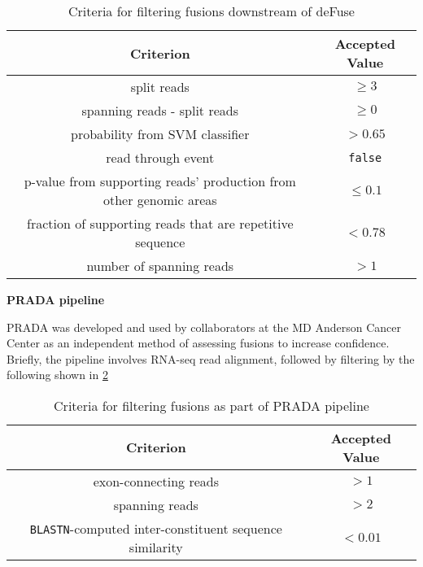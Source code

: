 \begin{description}
  \begin{table}
    \begin{center}
      \begin{tabular}{|c|c|} \hline \textbf{Criterion} &
        \textbf{Accepted Value} \\ \hline
        split reads & $\geq 3$ \\
        spanning reads - split reads & $\geq 0$\\
        probability from SVM classifier & $ > 0.65$\\
        read through event & \texttt{false}\\
        p-value from supporting reads' production from other
        genomic areas & $\leq 0.1$ \\
        fraction of supporting reads that are repetitive sequence
                                                       & $< 0.78$\\
        number of spanning reads & $> 1$ \\ \hline
      \end{tabular}
    \end{center}
    \caption{Criteria for filtering fusions downstream of
      deFuse} \label{filtering}
  \end{table}

  \textbf{PRADA pipeline}

  PRADA was developed and used by collaborators at the MD Anderson Cancer Center as
  an independent method of assessing fusions to increase
  confidence. Briefly, the pipeline involves RNA-seq read alignment,
  followed by filtering by the following shown in \ref{prada_filtering} 

  \begin{table}
    \begin{center}
      \begin{tabular}{|c|c|} \hline \textbf{Criterion} &
        \textbf{Accepted Value} \\ \hline
        exon-connecting reads & $ > 1$ \\
        spanning reads & $> 2$\\
        \texttt{BLASTN}\cite{altschul_basic_1990}-computed inter-constituent sequence
                                                       similarity & $
                                                                    <0.01$\\ \hline
      \end{tabular}
    \end{center}
    \caption{Criteria for filtering fusions as part of PRADA pipeline} \label{prada_filtering}
  \end{table}   
\end{description}


